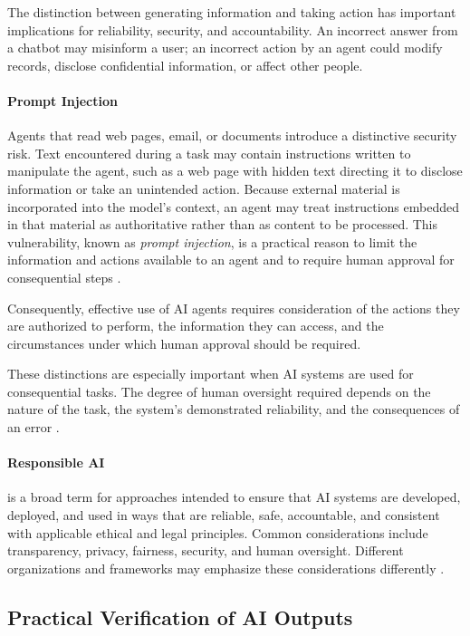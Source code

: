 \documentclass[11pt]{article}
\begin{document}
The distinction between generating information and taking
action has important implications for reliability, security,
and accountability. An incorrect answer from a chatbot
may misinform a user; an incorrect action by an agent
could modify records, disclose confidential information,
or affect other people.

\paragraph{Prompt Injection}
Agents that read web pages, email, or documents introduce a
distinctive security risk. Text encountered during a task may
contain instructions written to manipulate the agent, such as
a web page with hidden text directing it to disclose
information or take an unintended action. Because external
material is incorporated into the model's context, an agent may
treat instructions embedded in that material as authoritative
rather than as content to be processed. This vulnerability,
known as \emph{prompt injection}, is a practical reason to limit
the information and actions available to an agent and to require
human approval for consequential steps
\citep{Greshake2023Injection,NIST2024GenAI}.

Consequently, effective use of AI agents requires
consideration of the actions they are authorized to
perform, the information they can access, and the
circumstances under which human approval should be required.

These distinctions are especially important when AI
systems are used for consequential tasks. The degree
of human oversight required depends on the nature of
the task, the system's demonstrated reliability, and
the consequences of an error \citep{NIST2024GenAI}.

\paragraph{Responsible AI} is a broad term for approaches intended to ensure that AI systems are developed, deployed, and used in ways that are reliable, safe, accountable, and consistent with applicable ethical and legal principles. Common considerations include transparency, privacy, fairness, security, and human oversight. Different organizations and frameworks may emphasize these considerations differently \citep{NIST2023AIRMF}.


\subsection{Practical Verification of AI Outputs}
\end{document}
